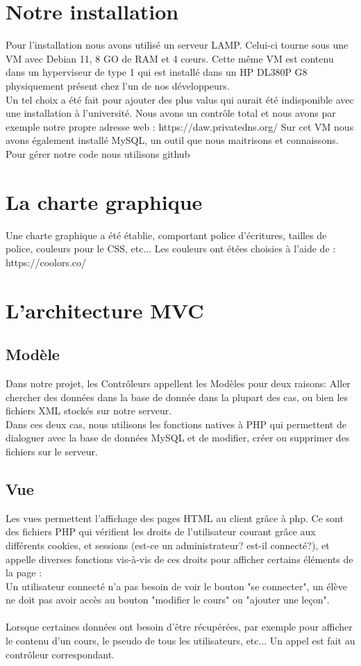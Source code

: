 \documentclass[a4paper,10pt]{article}
\begin{document}
\section{Notre installation}
Pour l'installation nous avons utilisé un serveur LAMP. Celui-ci tourne sous une VM avec Debian 11, 8 GO de RAM et 4 cœurs. Cette même VM est contenu dans un hyperviseur de type 1 qui est installé dans un HP DL380P G8 physiquement présent chez l'un de nos développeurs. \\
Un tel choix a été fait pour ajouter des plus valus qui aurait été indisponible avec une installation à l'université. Nous avons un contrôle total et nous avons par exemple notre propre adresse web : https://daw.privatedns.org/ 
Sur cet VM nous avons également installé MySQL, un outil que nous maitrisons et connaissons. \\ 
Pour gérer notre code nous utilisons github 

\section{La charte graphique}
Une charte graphique a été établie, comportant police d'écritures, tailles de police, couleurs pour le CSS, etc...
Les couleurs ont étées choisies à l'aide de : https://coolors.co/

\section{L'architecture MVC}
\subsection{Modèle}
Dans notre projet, les Contrôleurs appellent les Modèles pour deux raisons: Aller chercher des données dans la base de donnée dans la plupart des cas, ou bien les fichiers XML stockés sur notre serveur.\\
Dans ces deux cas, nous utilisons les fonctions natives à PHP qui permettent de dialoguer avec la base de données MySQL et de modifier, créer ou supprimer des fichiers sur le serveur.
\subsection{Vue}
Les vues permettent l'affichage des pages HTML au client grâce à php. Ce sont des fichiers PHP qui vérifient les droits de l'utilisateur courant grâce aux différents cookies, et sessions (est-ce un administrateur? est-il connecté?), et appelle diverses fonctions vis-à-vis de ces droits pour afficher certains éléments de la page : \\
Un utilisateur connecté n'a pas besoin de voir le bouton "se connecter", un élève ne doit pas avoir accès au bouton "modifier le cours" ou "ajouter une leçon".\\ \\
Lorsque certaines données ont besoin d'être récupérées, par exemple pour afficher le contenu d'un cours, le pseudo de tous les utilisateurs, etc... Un appel est fait au contrôleur correspondant.
\end{document}
